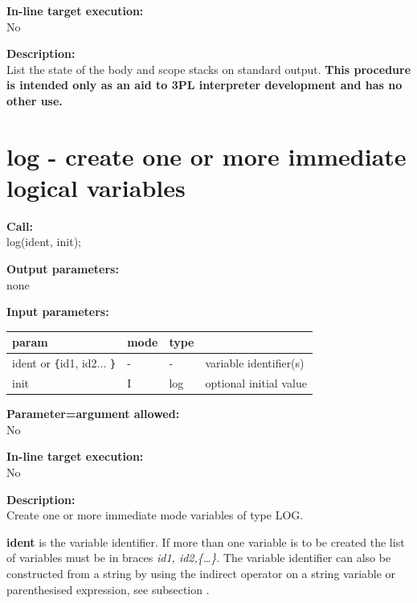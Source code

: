         {\bf In-line target execution:} \\
        No
        
        {\bf Description:} \\
        List the state of the body and scope stacks on standard output. {\bf This
        procedure is intended only as an aid to 3PL interpreter development and has no
        other use.}
        


    \section{log - create one or more immediate logical variables}\label{sec:iplog}
        
        {\bf Call:} \\
        log(ident, init);
        
        {\bf Output parameters:} \\
        none
        
        {\bf Input parameters:} \\
        \begin{tabular}{| l | l | l | l |}
        \hline
        param  & mode & type & \\
        \hline \hline
        ident or \verb'{'id1, id2... \verb'}' & - &  -  & variable identifier(s)   \\ \hline
        init                   & I & log & optional initial value   \\ \hline
        \end{tabular}
        
        {\bf Parameter=argument allowed:} \\
        No
        
        {\bf In-line target execution:} \\
        No
        
        {\bf Description:} \\
        Create one or more immediate mode variables of type LOG.

        {\bf ident} is the variable identifier. If more than one
        variable is to be created the list of variables must be in braces
        {\em id1, id2,\{\dots\}}. The variable identifier can also be constructed
        from a string by using the indirect operator on a string variable or
        parenthesised expression, see subsection .
        
